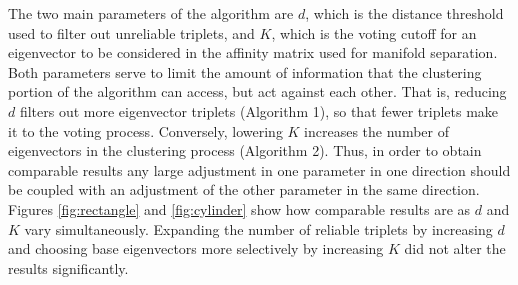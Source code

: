 \documentclass{article}
\numberwithin{equation}{section}
\theoremstyle{definition}
\begin{document}
The two main parameters of the algorithm are $d$, which is the distance threshold used to filter out unreliable triplets, and $K$, which is the voting cutoff for an eigenvector to be considered in the affinity matrix used for manifold separation. Both parameters serve to limit the amount of information that the clustering portion of the algorithm can access, but act against each other. That is, reducing $d$ filters out more eigenvector triplets (Algorithm 1), so that fewer triplets make it to the voting process. Conversely, lowering $K$ increases the number of eigenvectors in the clustering process (Algorithm 2). Thus, in order to obtain comparable results any large adjustment in one parameter in one direction should be coupled with an adjustment of the other parameter in the same direction. Figures \ref{fig:rectangle} and \ref{fig:cylinder} show how comparable results are as $d$ and $K$ vary simultaneously. Expanding the number of reliable triplets by increasing $d$ and choosing base eigenvectors more selectively by increasing $K$ did not alter the results significantly.
\end{document}

